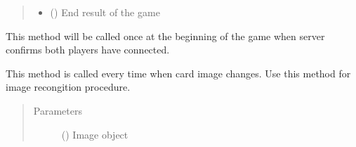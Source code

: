 \documentclass[letterpaper,10pt,english]{sphinxmanual}
\begin{document}
\begin{fulllineitems}
\begin{fulllineitems}
\begin{quote}
\begin{description}
\begin{itemize}
\item {} 
\sphinxAtStartPar
{} (\sphinxstyleliteralemphasis{\sphinxupquote{ {[}}}\sphinxstyleliteralemphasis{\sphinxupquote{, }}\sphinxstyleliteralemphasis{\sphinxupquote{{]}}}) \textendash{} End result of the game

\end{itemize}

\end{description}\end{quote}

\end{fulllineitems}


\begin{fulllineitems}
\label{\detokenize{agent:agent.PokerAgent.on_game_start}}
\pysigstartsignatures
{}
\pysigstopsignatures
\sphinxAtStartPar
This method will be called once at the beginning of the game when server confirms both players have connected.

\end{fulllineitems}


\begin{fulllineitems}
\label{\detokenize{agent:agent.PokerAgent.on_image}}
\pysigstartsignatures
{}
\pysigstopsignatures
\sphinxAtStartPar
This method is called every time when card image changes. Use this method for image recongition procedure.
\begin{quote}\begin{description}
\item[{Parameters}] \leavevmode
\sphinxAtStartPar
{} () \textendash{} Image object

\end{description}\end{quote}


\end{fulllineitems}
\end{fulllineitems}
\end{document}
